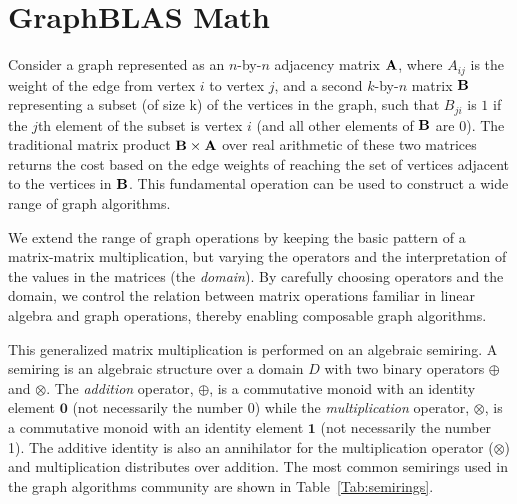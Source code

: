\section{GraphBLAS Math}
\label{sec:math}

Consider a graph represented as an $n$-by-$n$ adjacency matrix ${\bf A}$,
where $A_{ij}$ is the weight of the edge from vertex $i$ to vertex $j$,
and a second $k$-by-$n$ matrix ${\bf B}$ representing a subset (of size k) of the vertices
in the graph, such that $B_{ji}$ is $1$ if the $j$th element of the subset is vertex $i$
(and all other elements of ${\bf B}$ are 0).  The traditional matrix
product ${\bf B} \times {\bf A}$ over real arithmetic of these two matrices returns 
the cost based on the edge weights of reaching the set of vertices
adjacent to the vertices in ${\bf B}$.  This fundamental operation can be
used to construct a wide range of graph algorithms.

We extend the range of graph operations by keeping the basic
pattern of a matrix-matrix multiplication, but varying
the operators and the interpretation of the values in the matrices (the \emph{domain}).
By carefully choosing operators and the domain, we control the
relation between matrix operations familiar in linear algebra and graph operations, thereby enabling
composable graph algorithms.

This generalized matrix multiplication is performed on an algebraic semiring.   
A semiring is an algebraic
structure over a domain $D$ with two binary operators $\oplus$ and $\otimes$.
The \emph{addition} operator, $\oplus$, is a commutative monoid with an identity 
element $\mathbf{0}$ (not necessarily the number 0)
while the \emph{multiplication} operator, $\otimes$, is a commutative monoid with an 
identity element $\mathbf{1}$ (not necessarily the number 1).  The additive 
identity is also an annihilator for the multiplication 
operator ($\otimes$) and multiplication distributes over addition.  The most 
common semirings used in the graph algorithms community are 
shown in Table~\ref{Tab:semirings}.
  
